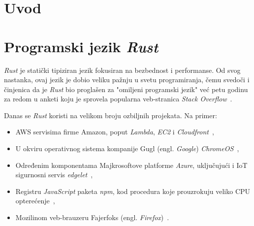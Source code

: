 \documentclass[12pt,oneside]{memoir}
\begin{document}
\frontmatter
\naslovna
\komisija
\apstrakt
\tableofcontents*

\mainmatter

\chapter{Uvod}
\chapter{Programski jezik \emph{Rust}}
\emph{Rust} je statički tipiziran jezik  fokusiran na bezbednost i
performanse. Od svog nastanka, ovaj jezik
je dobio veliku pažnju u svetu programiranja, čemu svedoči i činjenica da je
\emph{Rust} bio proglašen za "omiljeni programski jezik" već petu godinu za redom
u anketi koju je sprovela popularna veb-stranica \emph{Stack Overflow}~\cite{mostloved_so}.

Danas se \emph{Rust} koristi na velikom broju ozbiljnih projekata. Na primer:

\begin{itemize}
    \item AWS servisima firme Amazon, poput \emph{Lambda}, \emph{EC2}
        i \emph{Cloudfront}~\cite{aws},
    \item U okviru operativnog sistema kompanije Gugl (engl. \emph{Google})
        \emph{ChromeOS}~\cite{crosvm},
    \item Određenim komponentama Majkrosoftove platforme \emph{Azure}, uključujući i
        IoT sigurnosni servis \emph{edgelet}~\cite{edgelet},
    \item Registru \emph{JavaScript} paketa \emph{npm},
        kod procedura koje prouzrokuju veliko CPU opterećenje~\cite{npm},
    \item Mozilinom veb-brauzeru Fajerfoks (engl. \emph{Firefox})~\cite{firefox_rust}.
\end{itemize}
\end{document}
